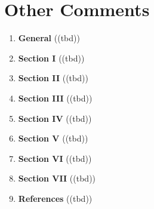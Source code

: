 
\section{Other Comments}\label{sec:other}
\begin{enumerate}[resume]
    \item \textbf{General} 	\textcolor{HighlightColor}{((tbd))}
    \item \textbf{Section I} 	\textcolor{HighlightColor}{((tbd))}
    \item \textbf{Section II} 	\textcolor{HighlightColor}{((tbd))}
    \item \textbf{Section III} 	\textcolor{HighlightColor}{((tbd))}
    \item \textbf{Section IV} 	\textcolor{HighlightColor}{((tbd))}
    \item \textbf{Section V} 	\textcolor{HighlightColor}{((tbd))}
    \item \textbf{Section VI} 	\textcolor{HighlightColor}{((tbd))}
    \item \textbf{Section VII} 	\textcolor{HighlightColor}{((tbd))}
    \item \textbf{References} 	\textcolor{HighlightColor}{((tbd))}
\end{enumerate}
